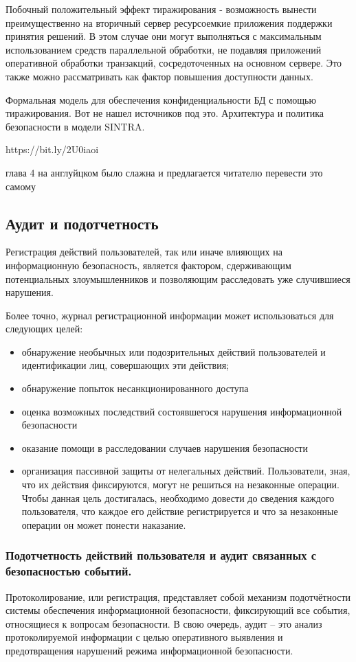 Побочный положительный эффект тиражирования - возможность вынести преимущественно на вторичный сервер ресурсоемкие приложения поддержки принятия решений. В этом случае они могут выполняться с максимальным использованием средств параллельной обработки, не подавляя приложений оперативной обработки транзакций, сосредоточенных на основном сервере. Это также можно рассматривать как фактор повышения доступности данных.

Формальная модель для обеспечения конфиденциальности БД с помощью тиражирования.
Вот не нашел источников под это.
Архитектура и политика безопасности в модели SINTRA.

https://bit.ly/2U0iaoi

глава 4 на англуйцком было слажна и предлагается читателю перевести это самому
\subsection{Аудит и подотчетность}
Регистрация действий пользователей, так или иначе влияющих на информационную безопасность, является фактором, сдерживающим потенциальных злоумышленников и позволяющим расследовать уже случившиеся нарушения.

Более точно, журнал регистрационной информации может использоваться для следующих целей:
\begin{itemize}
    \item обнаружение необычных или подозрительных действий пользователей и идентификации лиц, совершающих эти действия;
    \item обнаружение попыток несанкционированного доступа
    \item оценка возможных последствий состоявшегося нарушения информационной безопасности
    \item оказание помощи в расследовании случаев нарушения безопасности
    \item организация пассивной защиты от нелегальных действий. Пользователи, зная, что их действия фиксируются, могут не решиться на незаконные операции. Чтобы данная цель достигалась, необходимо довести до сведения каждого пользователя, что каждое его действие регистрируется и что за незаконные операции он может понести наказание.
\end{itemize}



\subsubsection{Подотчетность действий пользователя и аудит связанных с безопасностью событий.}
Протоколирование, или регистрация, представляет собой механизм подотчётности системы обеспечения информационной безопасности, фиксирующий все события, относящиеся к вопросам безопасности. В свою очередь, аудит – это анализ протоколируемой информации с целью оперативного выявления и предотвращения нарушений режима информационной безопасности.

